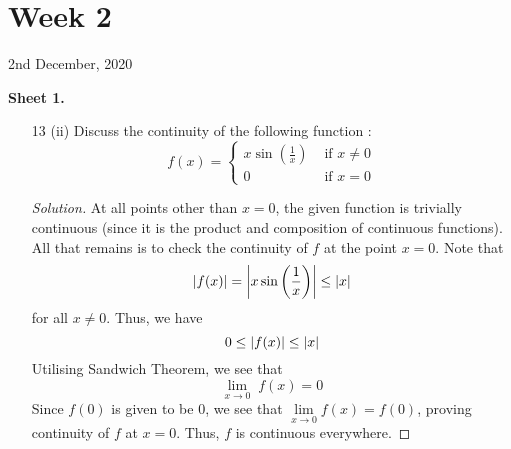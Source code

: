 \documentclass[12pt]{article}
\def\ddfrac#1#2{\displaystyle\frac{\displaystyle #1}{\displaystyle #2}}
\theoremstyle{definition}
\newenvironment{soln}{\begin{proof}[Solution]}{\end{proof}}
\begin{document}
\newpage\section{Week 2}
\begin{center}
	2nd December, 2020
\end{center}
\textbf{Sheet 1.}
\begin{enumerate}[leftmargin=*]
    \itemsep0.5em
    \item[13 (ii)] Discuss the continuity of the following function :
    \[
        f(x) = \begin{cases}
            x \sin\left( \ddfrac{1}{x} \right) & \text{ if } x \neq 0 \\
            0 & \text{ if } x=0
        \end{cases}
    \]
    \begin{soln}
        At all points other than $x=0$, the given function is trivially continuous (since it is the product and composition of continuous functions). All that remains is to check the continuity of $f$ at the point $x=0$. Note that 
        \[
            \abs{f(x)} = \abs{x \sin\left( \frac{1}{x} \right)} \leq \abs{x}
        \]
        for all $x \neq 0$. Thus, we have
        \[
            0 \leq \abs{f(x)} \leq \abs{x}
        \]
        Utilising Sandwich Theorem, we see that
        \[
            \lim_{x \to 0} \; f(x) = 0
        \]
        Since $f(0)$ is given to be $0$, we see that $\lim\limits_{x \to 0} f(x) = f(0)$, proving continuity of $f$ at $x=0$. Thus, $f$ is continuous everywhere.
    \end{soln}
    
    \newpage 
    

\end{enumerate}
\end{document}
